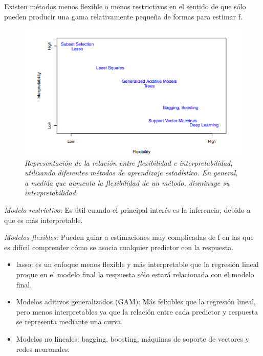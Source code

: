 \documentclass[
  letterpaper,
  DIV=11,
  numbers=noendperiod]{scrartcl}
\begin{document}
Existen métodos menos flexible o menos restrictivos en el sentido de que
sólo pueden producir una gama relativamente pequeña de formas para
estimar f.

\begin{figure}

{\centering \includegraphics[width=4.86458in,height=\textheight]{images/flexibilidad.png}

}

\caption{\emph{Representación de la relación entre flexibilidad e
interpretabilidad, utilizando diferentes métodos de aprendizaje
estadístico. En general, a medida que aumenta la flexibilidad de un
método, disminuye su interpretabilidad.}}

\end{figure}

\emph{Modelo restrictivo:} Es útil cuando el principal interés es la
inferencia, debido a que es más interpretable.

\emph{Modelos flexibles:} Pueden guiar a estimaciones muy complicadas de
f en las que es difícil comprender cómo se asocia cualquier predictor
con la respuesta.

\begin{itemize}
\item
  lasso: es un enfoque menos flexible y más interpretable que la
  regresión lineal proque en el modelo final la respuesta sólo estará
  relacionada con el modelo final.
\item
  Modelos aditivos generalizados (GAM): Más felxibles que la regresión
  lineal, pero menos interpretables ya que la relación entre cada
  predictor y respuesta se representa mediante una curva.
\item
  Modelos no lineales: bagging, boosting, máquinas de soporte de
  vectores y redes neuronales.
\end{itemize}
\end{document}
